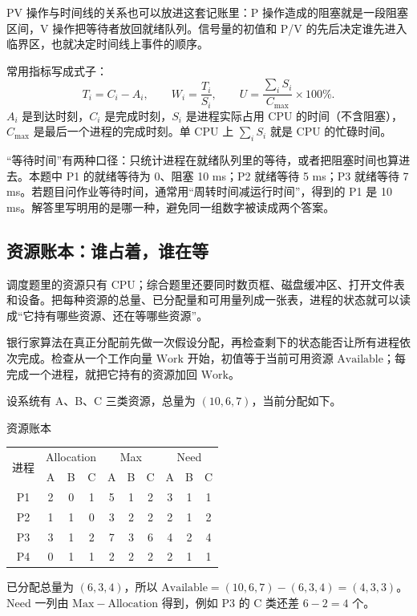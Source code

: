 PV 操作与时间线的关系也可以放进这套记账里：P 操作造成的阻塞就是一段阻塞区间，V 操作把等待者放回就绪队列。信号量的初值和 P/V 的先后决定谁先进入临界区，也就决定时间线上事件的顺序。

常用指标写成式子：
\[
T_i=C_i-A_i,\qquad W_i=\frac{T_i}{S_i},\qquad U=\frac{\sum_i S_i}{C_{\max}}\times100\%.
\]
$A_i$ 是到达时刻，$C_i$ 是完成时刻，$S_i$ 是进程实际占用 CPU 的时间（不含阻塞），$C_{\max}$ 是最后一个进程的完成时刻。单 CPU 上 $\sum_i S_i$ 就是 CPU 的忙碌时间。

“等待时间”有两种口径：只统计进程在就绪队列里的等待，或者把阻塞时间也算进去。本题中 P1 的就绪等待为 0、阻塞 10 ms；P2 就绪等待 5 ms；P3 就绪等待 7 ms。若题目问作业等待时间，通常用“周转时间减运行时间”，得到的 P1 是 10 ms。解答里写明用的是哪一种，避免同一组数字被读成两个答案。

\subsection{资源账本：谁占着，谁在等}

调度题里的资源只有 CPU；综合题里还要同时数页框、磁盘缓冲区、打开文件表和设备。把每种资源的总量、已分配量和可用量列成一张表，进程的状态就可以读成“它持有哪些资源、还在等哪些资源”。

银行家算法在真正分配前先做一次假设分配，再检查剩下的状态能否让所有进程依次完成。检查从一个工作向量 $\mathrm{Work}$ 开始，初值等于当前可用资源 $\mathrm{Available}$；每完成一个进程，就把它持有的资源加回 $\mathrm{Work}$。

设系统有 A、B、C 三类资源，总量为 $(10,6,7)$，当前分配如下。

\begin{tablebox}{资源账本}
\centering
\small
\begin{tabular}{|c|ccc|ccc|ccc|}
\hline
\multirow{2}{*}{进程} & \multicolumn{3}{c|}{Allocation} & \multicolumn{3}{c|}{Max} & \multicolumn{3}{c|}{Need} \\
 & A & B & C & A & B & C & A & B & C \\
\hline
P1 & 2 & 0 & 1 & 5 & 1 & 2 & 3 & 1 & 1 \\
P2 & 1 & 1 & 0 & 3 & 2 & 2 & 2 & 1 & 2 \\
P3 & 3 & 1 & 2 & 7 & 3 & 6 & 4 & 2 & 4 \\
P4 & 0 & 1 & 1 & 2 & 2 & 2 & 2 & 1 & 1 \\
\hline
\end{tabular}
\end{tablebox}

已分配总量为 $(6,3,4)$，所以 $\mathrm{Available}=(10,6,7)-(6,3,4)=(4,3,3)$。Need 一列由 $\mathrm{Max}-\mathrm{Allocation}$ 得到，例如 P3 的 C 类还差 $6-2=4$ 个。

